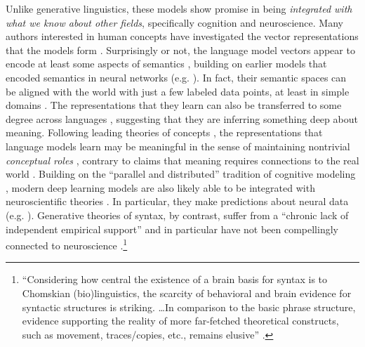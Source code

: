 \documentclass[output=paper,colorlinks,citecolor=brown
]{langscibook}
\begin{document}
Unlike generative linguistics, these models show promise in being \textit{integrated with what we know about other fields}, specifically cognition and neuroscience. Many authors interested in human  concepts have investigated the vector representations that the models form \citep{lake2021word,bhatia2022transformer}. Surprisingly or not, the language model vectors appear to encode at least some aspects of semantics \citep{maas2011learning,socher2013recursive,bowman2015recursive,grand2022semantic,bhatia2022transformer,bhatia2022transformer,piantadosi2022meaning,dasgupta2022language,petersen2022lexical,pavlick2022semantic}, building on earlier models that encoded semantics in neural networks (e.g. \citealt{rogers2004semantic,elman2004alternative,mikolov2013distributed}). In fact, their semantic spaces can be aligned with the world with just a few labeled data points, at least in simple domains \citep{patel2022mapping}. The representations that they learn can also be transferred to some degree across languages \citep{pires2019multilingual,chi2020finding,gonen2020s,papadimitriou2020learning,papadimitriou2021deep,hill2017representational}, suggesting that they are inferring something deep about meaning. Following leading theories of concepts \citep{block1986advertisement,block1998conceptual}, the representations that language models learn may be meaningful in the sense of maintaining nontrivial \textit{conceptual roles} \citep{piantadosi2022meaning}, contrary to claims that meaning requires connections to the real world \citep{bender2020climbing}. Building on the ``parallel and distributed'' tradition of cognitive modeling \citep{mcclelland1986parallel}, modern deep learning models are also likely able to be integrated with neuroscientific theories \citep{marblestone2016toward,richards2019deep,kanwisher2023using,mcclelland2020placing}. In particular, they make predictions about neural data (e.g. \citealt{schrimpf2021neural,caucheteux2022deep,goldstein2022shared}). Generative theories of syntax, by contrast, suffer from a ``chronic lack of independent empirical support'' and in particular have not been compellingly connected to neuroscience \citep{edelman2019verbal}.\footnote{``Considering how central the existence of a brain basis for syntax is to Chomskian (bio)linguistics, the scarcity of behavioral and brain evidence for syntactic structures is striking.  \ldots  In comparison to the basic phrase structure, evidence supporting the reality of more far-fetched theoretical constructs, such as movement, traces/copies, etc., remains elusive'' \citep{edelman2019verbal}.}
\end{document}
